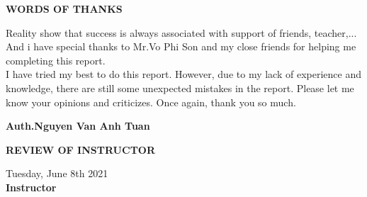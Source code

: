 \documentclass[a4paper,13pt]{report}
\begin{document}
    \newpage
    \thispagestyle{plain}
    \centering
    \centerline{\textbf{\huge{WORDS OF THANKS}}}
    \vspace{10mm}
    \begin{flushleft}
        Reality show that success is always associated with support of friends, teacher,... And i have special thanks to Mr.Vo Phi Son and my close friends 
        for helping me completing this report. \\ 
        \vspace{2mm}
        I have tried my best to do this report. However, due to my lack of experience and 
        knowledge, there are still some unexpected mistakes in the report. Please let me know your opinions and criticizes.
        Once again, thank you so much. 
    \end{flushleft}
    \begin{flushright}
        \textbf{Auth.Nguyen Van Anh Tuan}
    \end{flushright}
    
    \newpage
    \centerline{\huge{\textbf{REVIEW OF INSTRUCTOR}}}
    \vspace{10mm}
    \noindent\makebox[\linewidth]{\rule{\paperwidth}{0.4pt}}
    \noindent\makebox[\linewidth]{\rule{\paperwidth}{0.4pt}}
    \noindent\makebox[\linewidth]{\rule{\paperwidth}{0.4pt}}
    \noindent\makebox[\linewidth]{\rule{\paperwidth}{0.4pt}}
    \noindent\makebox[\linewidth]{\rule{\paperwidth}{0.4pt}}
    \noindent\makebox[\linewidth]{\rule{\paperwidth}{0.4pt}}
    \noindent\makebox[\linewidth]{\rule{\paperwidth}{0.4pt}}
    \noindent\makebox[\linewidth]{\rule{\paperwidth}{0.4pt}}
    \noindent\makebox[\linewidth]{\rule{\paperwidth}{0.4pt}}
    \noindent\makebox[\linewidth]{\rule{\paperwidth}{0.4pt}}
    \noindent\makebox[\linewidth]{\rule{\paperwidth}{0.4pt}}
    \noindent\makebox[\linewidth]{\rule{\paperwidth}{0.4pt}}
    \noindent\makebox[\linewidth]{\rule{\paperwidth}{0.4pt}}
    \noindent\makebox[\linewidth]{\rule{\paperwidth}{0.4pt}}
    \noindent\makebox[\linewidth]{\rule{\paperwidth}{0.4pt}}
    \vspace{10mm}
    \begin{flushright}
        Tuesday, June 8th 2021 \\ 
        \vspace{5mm}
        \textbf{Instructor}
    \end{flushright}
\end{document}
